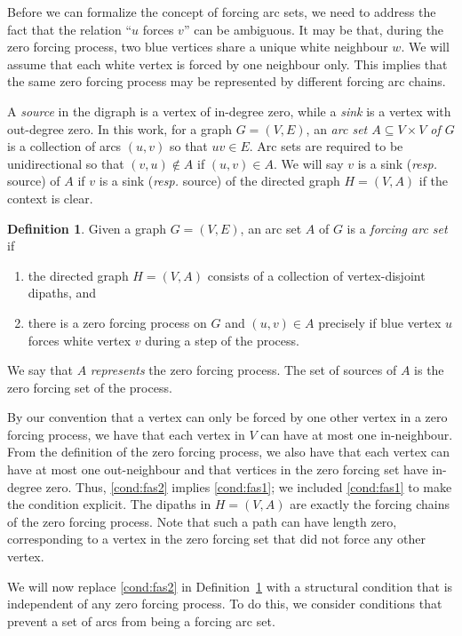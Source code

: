 \documentclass[12pt]{amsart}
\theoremstyle{plain}
\theoremstyle{definition}
\newtheorem{definition}{Definition}[section]
\begin{document}
Before we can formalize the concept of forcing arc sets, we need to address the fact that the relation ``$u$ forces $v$'' can be ambiguous. It may be that, during the zero forcing process, two blue vertices share a unique white neighbour $w$. We will assume that each white vertex is forced by one neighbour only. This implies that the same zero forcing process may be represented by different forcing arc chains. 

A \emph{source} in the digraph is a vertex of in-degree zero, while a \emph{sink} is a vertex with out-degree zero.
In this work, for a graph $G = (V, E)$, an {\em arc set $A\subseteq V\times V$ of $G$} is a collection of arcs $(u,v)$ so that $uv\in E$. Arc sets are required to be unidirectional so that $(v, u)\not\in A$ if $(u, v)\in A$. 
We will say $v$ is a sink ({\em resp.} source) of $A$ if $v$ is a sink ({\em resp.} source) of the directed graph $H = (V, A)$ if the context is clear.
\begin{definition}\label{def:fas} 
Given a graph $G = (V, E)$, an arc set $A$ of $G$ is a \emph{forcing arc set} if 
\begin{enumerate}[label=(P\arabic*),align=right]
\item\label{cond:fas1} the directed graph $H=(V, A)$ consists of a collection of vertex-disjoint dipaths, and
\item\label{cond:fas2} 
there is a zero forcing process on $G$ and $(u,v)\in A$ precisely if blue vertex $u$ forces white vertex $v$ during a step of the process. 
\end{enumerate}  
We say that $A$ \emph{represents} the zero forcing process.
The set of sources of $A$ is the zero forcing set of the process. 
\end{definition}

By our convention that a vertex can only be forced by one other vertex in a zero forcing process, we have that each vertex in $V$ can have at most one in-neighbour. From the definition of the zero forcing process, we also have that each vertex can have at most one out-neighbour and that vertices in the zero forcing set have in-degree zero.  Thus,   \ref{cond:fas2} implies \ref{cond:fas1}; we included \ref{cond:fas1} to make the condition explicit. The dipaths in $H=(V,A)$ are exactly the forcing chains of the zero forcing process. Note that such a path can have length zero, corresponding to a vertex in the zero forcing set that did not force any other vertex. 



We will now replace \ref{cond:fas2} in Definition~\ref{def:fas} with a structural condition that is independent of any zero forcing process. To do this, we consider conditions that prevent a set of arcs from being a forcing arc set. 
\end{document}
